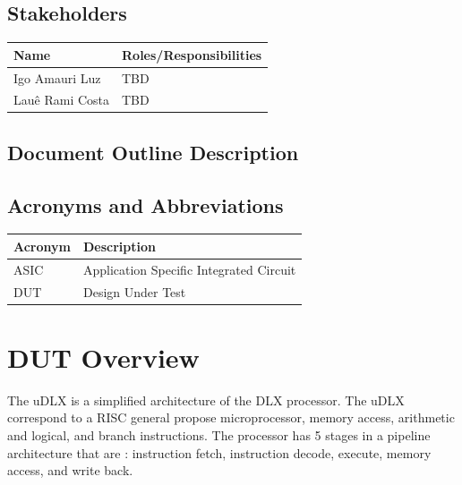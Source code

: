 \documentclass{article}
\begin{document}
	\subsection{Stakeholders}
  \FloatBarrier
  \begin{table}[H] 
    \begin{center}
      \begin{tabular}[pos]{|m{5cm} | m{8cm}|} 
        \hline %
        \cellcolor[gray]{0.9}\textbf{Name} & \cellcolor[gray]{0.9}\textbf{Roles/Responsibilities} \\ \hline
        Igo Amauri Luz & TBD \\ \hline
        Lauê Rami Costa & TBD \\ \hline
      \end{tabular}
    \end{center}
  \end{table} 
  
  \subsection{Document Outline Description}	
  
  \subsection{Acronyms and Abbreviations}
  \FloatBarrier
  \begin{table}[H]
    \begin{center}
      \begin{tabular}[pos]{|m{2cm} | m{11cm}|} 
				\hline 
				\cellcolor[gray]{0.9}\textbf{Acronym} & \cellcolor[gray]{0.9}\textbf{Description} \\ \hline
				ASIC 	& Application Specific Integrated Circuit  \\ \hline
				DUT		& Design Under Test \\ \hline
      \end{tabular}
    \end{center}
  \end{table}  

	\newpage
	\section{DUT Overview}
	The  uDLX is a simplified architecture of the DLX processor. The uDLX correspond to a RISC general propose microprocessor, memory access, arithmetic and logical, and branch instructions. The processor has 5 stages in a pipeline architecture that are : instruction fetch, instruction decode, execute, memory access, and write back.
\end{document}
